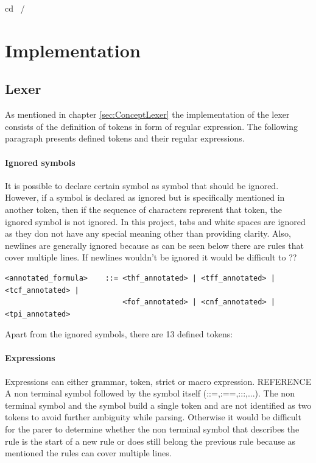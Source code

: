 cd ~/%


\chapter{Implementation}\label{cha:Implementation}

\section{Lexer}\label{sec:ImplementationLexer}

As mentioned in chapter \ref{sec:ConceptLexer} the implementation of the lexer consists of the definition of tokens in form of regular expression. The following paragraph presents defined tokens and their regular expressions.

\subsubsection{Ignored symbols}
It is possible to declare certain symbol as symbol that should be ignored. However, if a symbol is declared as ignored but is specifically mentioned in another token, then if the sequence of characters represent that token, the ignored symbol is not ignored. 
In this project, tabs and white spaces are ignored as they don not have any special meaning other than providing clarity. 
Also, newlines are generally ignored because as can be seen below there are rules that cover multiple lines. If newlines wouldn't be ignored it would be difficult to ??

\begin{lstlisting}[basicstyle=\scriptsize	,caption= Example of a multi line production rule,label= lst:Lexer_example_multiline]
<annotated_formula>    ::= <thf_annotated> | <tff_annotated> | <tcf_annotated> |
                           <fof_annotated> | <cnf_annotated> | <tpi_annotated>
\end{lstlisting}

Apart from the ignored symbols, there are 13 defined tokens:

\subsubsection{Expressions}

Expressions can either grammar, token, strict or macro expression. REFERENCE
A non terminal symbol followed by the symbol itself (::=,:==,:::,...). The non terminal symbol and the symbol build a single token and are not identified as two tokens to avoid further ambiguity while parsing. Otherwise it would be difficult for the parer to determine whether the non terminal symbol that describes the rule is the start of a new rule or does still belong the previous rule because as mentioned the rules can cover multiple lines.

